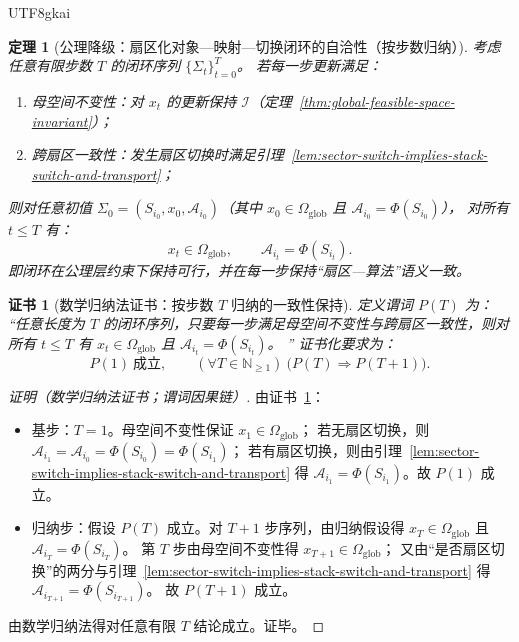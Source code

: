 \documentclass[12pt]{article}
\newtheorem{theorem}{定理}[section]
\newtheorem{Certificate}{证书}[section]
\newcommand{\NN}{\mathbb{N}}
\begin{document}
\begin{CJK*}{UTF8}{gkai}
\begin{theorem}[公理降级：扇区化对象—映射—切换闭环的自洽性（按步数归纳）]
\label{thm:sectorized-loop-consistency}
考虑任意有限步数 $T$ 的闭环序列 $\{\Sigma_t\}_{t=0}^{T}$。
若每一步更新满足：
\begin{enumerate}
  \item 母空间不变性：对 $x_t$ 的更新保持 $\mathcal{I}$（定理~\ref{thm:global-feasible-space-invariant}）；
  \item 跨扇区一致性：发生扇区切换时满足引理~\ref{lem:sector-switch-implies-stack-switch-and-transport}；
\end{enumerate}
则对任意初值 $\Sigma_0=(S_{i_0},x_0,\mathcal{A}_{i_0})$（其中 $x_0\in\Omega_{\mathrm{glob}}$ 且 $\mathcal{A}_{i_0}=\Phi(S_{i_0})$），
  对所有 $t\le T$ 有：
\[
  x_t\in\Omega_{\mathrm{glob}},\qquad \mathcal{A}_{i_t}=\Phi(S_{i_t}).
\]
即闭环在公理层约束下保持可行，并在每一步保持“扇区—算法”语义一致。
\end{theorem}

\begin{Certificate}[数学归纳法证书：按步数 $T$ 归纳的一致性保持]
\label{cert:sectorized-loop-consistency}
定义谓词 $P(T)$ 为：
“任意长度为 $T$ 的闭环序列，只要每一步满足母空间不变性与跨扇区一致性，则对所有 $t\le T$ 有 $x_t\in\Omega_{\mathrm{glob}}$ 且 $\mathcal{A}_{i_t}=\Phi(S_{i_t})$。
  ”
证书化要求为：
\[
  P(1)\ \text{成立},\qquad
  (\forall T\in\NN_{\ge 1})\ \bigl(P(T)\Rightarrow P(T+1)\bigr).
\]
\end{Certificate}

\begin{proof}[证明（数学归纳法证书；谓词因果链）]
由证书~\ref{cert:sectorized-loop-consistency}：
\begin{itemize}
  \item 基步：$T=1$。母空间不变性保证 $x_1\in\Omega_{\mathrm{glob}}$；
  若无扇区切换，则 $\mathcal{A}_{i_1}=\mathcal{A}_{i_0}=\Phi(S_{i_0})=\Phi(S_{i_1})$；
  若有扇区切换，则由引理~\ref{lem:sector-switch-implies-stack-switch-and-transport} 得 $\mathcal{A}_{i_1}=\Phi(S_{i_1})$。故 $P(1)$ 成立。

  \item 归纳步：假设 $P(T)$ 成立。对 $T+1$ 步序列，由归纳假设得 $x_T\in\Omega_{\mathrm{glob}}$ 且 $\mathcal{A}_{i_T}=\Phi(S_{i_T})$。
  第 $T$ 步由母空间不变性得 $x_{T+1}\in\Omega_{\mathrm{glob}}$；
  又由“是否扇区切换”的两分与引理~\ref{lem:sector-switch-implies-stack-switch-and-transport} 得 $\mathcal{A}_{i_{T+1}}=\Phi(S_{i_{T+1}})
    $。
  故 $P(T+1)$ 成立。
\end{itemize}
由数学归纳法得对任意有限 $T$ 结论成立。证毕。
\end{proof}


\end{CJK*}
\end{document}
